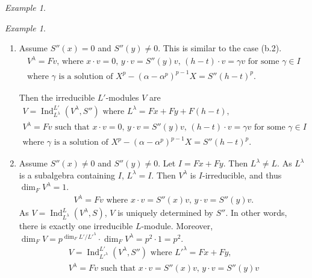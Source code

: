 \documentclass[12pt,MSc]{muthesis_2023}
\theoremstyle{plain}%
\theoremstyle{definition}
\theoremstyle{remark}
\newtheorem{Example}[FactCounter]{Example} %
\DeclareMathOperator{\Ind}{Ind}
\begin{document}
\begin{Example}
\begin{enumerate}
\begin{Example}
\begin{enumerate}
\item[(c.3)]Assume $S''(x)=0$ and $S''(y)\neq0$. This is similar to the case (b.2).
\begin{align*}
\text{$V^{\lambda}=Fv$, where $x \cdot v=0$, $y \cdot v=S''(y) v$, $(h-t)\cdot v=\gamma v$ for some $\gamma \in I$}\\
\text{where $\gamma$ is a solution of $X^p-(\alpha-\alpha^p)^{p-1}X={S''(h-t)}^p$.}
\end{align*}

Then the irreducible $L'$-modules $V$ are
\begin{align*}
\text{$V=\Ind^{L'}_{L^{\lambda}}(V^{\lambda}, S'')$ where $L^{\lambda}=Fx+Fy+F(h-t)$},\\
\text{$V^{\lambda}=Fv$ such that $x \cdot v=0$, $y \cdot v=S''(y) v$, $(h-t)\cdot v=\gamma v$ for some $\gamma \in I$}\\
\text{where $\gamma$ is a solution of $X^p-(\alpha-\alpha^p)^{p-1}X={S''(h-t)}^p$.}
\end{align*}
\item[(b.4)] Assume $S''(x)\neq 0$ and $S''(y)\neq0$. Let $I=Fx+Fy$. Then $L^{\lambda}\neq L$. As $L^{\lambda}$ is a subalgebra containing $I$, $L^{\lambda}=I$. Then $V^{\lambda}$ is $I$-irreducible, and thus $\dim_FV^{\lambda}=1$.
 \begin{align*}
\text{$V^{\lambda}=Fv$ where $x\cdot v=S''(x)v$, $y \cdot v=S''(y)v$.}
\end{align*}
As $V=\Ind^L_{L^{\lambda}}(V^{\lambda}, S)$, $V$ is uniquely determined by $S''$. In other words, there is exactly one irreducible $L$-module. Moreover, $\dim_FV=p^{\dim_FL'/{L'}^{\lambda}}\cdot \dim_FV^{\lambda}=p^2\cdot 1=p^2$.
\begin{align*}
\text{$V=\Ind^{L'}_{L'^{\lambda}}(V^{\lambda}, S'')$ where ${L'}^{\lambda}=Fx+Fy$},\\
\text{$V^{\lambda}=Fv$ such that $x \cdot v=S''(x)v$, $y \cdot v=S''(y)v$}\\
\end{align*}
\end{enumerate}
\end{Example}




\end{enumerate}
\end{Example}
\end{document}
